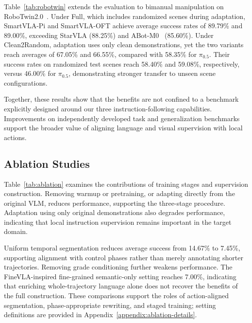 %

Table~\ref{tab:robotwin} extends the evaluation to bimanual manipulation on
RoboTwin2.0~\citep{mu2025robotwin,chen2025robotwin2}. Under Full, which includes
randomized scenes during adaptation, SmartVLA-Pi and SmartVLA-OFT achieve average success rates of
89.79\% and 89.00\%, exceeding StarVLA (88.25\%) and ABot-M0~\citep{yang2026abotm0} (85.60\%). Under
Clean2Random, adaptation uses only clean demonstrations, yet the two variants reach averages of
67.05\% and 66.55\%, compared with 58.35\% for $\pi_{0.5}$. Their success rates on randomized test
scenes reach 58.40\% and 59.08\%, respectively, versus 46.00\% for $\pi_{0.5}$, demonstrating
stronger transfer to unseen scene configurations.

Together, these results show that the benefits are not confined to a benchmark explicitly designed
around our three instruction-following capabilities. Improvements on independently developed task
and generalization benchmarks support the broader value of aligning language and visual supervision
with local actions.

\subsection{Ablation Studies}\label{ablation-studies}

\begingroup
\setlength{\parskip}{0pt}
Table~\ref{tab:ablation} examines the contributions of training stages and supervision construction.
Removing warmup or pretraining, or adapting directly from the original VLM, reduces performance,
supporting the three-stage procedure. Adaptation using only original demonstrations also degrades
performance, indicating that local instruction supervision remains important in the target domain.

%

Uniform temporal segmentation reduces average success from 14.67\% to 7.45\%, supporting alignment
with control phases rather than merely annotating shorter trajectories. Removing grade conditioning
further weakens performance. The FineVLA-inspired fine-grained semantic-only setting reaches 7.00\%,
indicating that enriching whole-trajectory language alone does not recover the benefits of the full
construction. These comparisons support the roles of action-aligned segmentation, phase-appropriate
rewriting, and staged training; setting definitions are provided in
Appendix~\ref{appendix:ablation-details}.
\par
\endgroup

